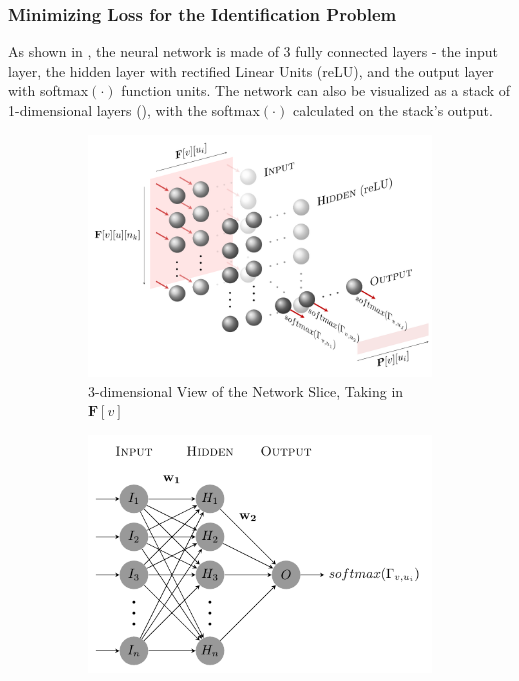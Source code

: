 \documentclass[12pt]{article}
\newcommand{\matr}[1]{\mathbf{#1}}  %
\begin{document}
    \subsubsection{Minimizing Loss for the Identification Problem} \label{sec:Minimizing Loss for the Identification Problem}
    As shown in , the neural network is made of 3 fully connected layers - the input layer, the hidden layer with rectified Linear Units (reLU), and the output layer with softmax$(\cdot)$ function units. The network can also be visualized as a stack of 1-dimensional layers (), with the softmax$(\cdot)$ calculated on the stack's output.
    \begin{figure}[!htbp]
        \centering
        \begin{subfigure}{\textwidth}
            \centering
            \includegraphics[width=\textwidth]{weights_net}
            \caption{3-dimensional View of the Network Slice, Taking in $\matr{F}[v]$}
            \label{fig:3-dimensional view of the network slice taking in Fv}
        \end{subfigure}
        \begin{subfigure}{.75\textwidth}
            \centering
            \includegraphics[width=\textwidth]{weights_net_side}

\end{subfigure}
\end{figure}
\end{document}
